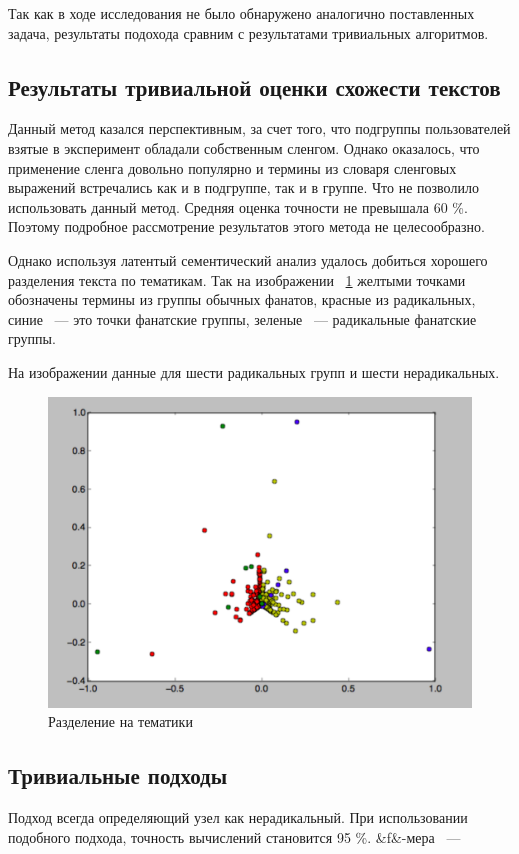 \documentclass[annotation,times,page4]{itmo-student-thesis}
\begin{document}
Так как в ходе исследования не было обнаружено аналогично поставленных задача, результаты подохода сравним с результатами тривиальных алгоритмов.
\subsection{Результаты тривиальной оценки схожести текстов}
Данный метод казался перспективным, за счет того, что подгруппы пользователей взятые в эксперимент обладали собственным сленгом. Однако оказалось, что 
применение сленга довольно популярно и термины из словаря сленговых выражений встречались как и в подгруппе, так и в группе. Что не позволило использовать данный метод. Средняя оценка точности не превышала 60 \%. Поэтому подробное рассмотрение результатов этого метода не целесообразно.

Однако используя латентый сементический анализ удалось добиться хорошего разделения текста по тематикам. Так на изображении ~\ref{fig:sem} желтыми точками обозначены термины из группы обычных фанатов, красные из радикальных, синие ~--- это точки фанатские группы, зеленые ~--- радикальные фанатские группы. 

На изображении данные для шести радикальных групп и шести нерадикальных. 
\begin{figure}[!h]
\caption{Разделение на тематики}
\label{fig:sem}
\centering
\includegraphics[width=\textwidth]{figs/sem.pdf}
\end{figure}

\newpage
\subsection{Тривиальные подходы}
Подход всегда определяющий узел как нерадикальный. 
При использовании подобного подхода, точность вычислений становится 95 \%. 
&f&-мера ~---
\end{document}
